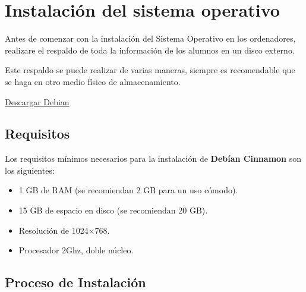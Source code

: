 		\section{Instalación del sistema operativo}
			
	 		Antes de comenzar con la instalación del Sistema Operativo en los ordenadores, realizare el respaldo de toda la información de los alumnos en un disco externo.\par
	 		
	 		Este respaldo se puede realizar de varias maneras, siempre es recomendable que se haga en otro medio físico de almacenamiento.\par
			
			\begin{tcolorbox}[enhanced,attach boxed title to top center={yshift=-3mm,yshifttext=-1mm},
				colback=blue!5!white,colframe=blue!75!black,colbacktitle=red!80!black,title= Debian,fonttitle=\bfseries, boxed title style={size=small,colframe=red!50!black} ]
		
				\centering
		
				\href{https://cdimage.debian.org/debian-cd/current/amd64/bt-dvd/}{\color{blue}{}Descargar Debian	}
			
			\end{tcolorbox}
				
			\subsection{Requisitos}
				
				Los requisitos mínimos necesarios para la instalación de \textbf{Debían Cinnamon} son los siguientes:
				
				\begin{itemize}
					
					\item 1 GB de RAM (se recomiendan 2 GB para un uso cómodo).
					\item 15 GB de espacio en disco (se recomiendan 20 GB).
					\item Resolución de 1024×768.
					\item Procesador 2Ghz, doble núcleo.
					
				\end{itemize}
			
			\subsection{Proceso de Instalación}
			
